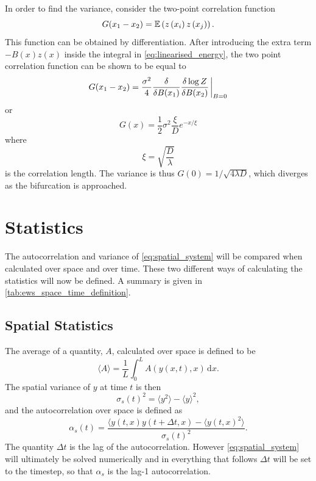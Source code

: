 In order to find the variance, consider the two-point correlation function
\begin{equation}
  \label{eq:two_point_corr}
  G(x_1 - x_2) = \operatorname*{\mathbb{E}} \left(z\left(x_i\right)z\left(x_j\right)\right).
\end{equation}
This function can be obtained by differentiation. After introducing the extra term $-B(x)z(x)$ inside the integral in \cref{eq:linearised_energy}, the two point correlation function
can be shown \parencite{Goldenfeld1992} to be equal to
\begin{equation}
  \label{eq:two_point_from_partition}
  G(x_1-x_2) = \frac{\sigma^2}{4}\fdv{B(x_1)}\fdv{\log Z}{B(x_2)} \eval_{B=0}
\end{equation}
or
\begin{equation}
  \label{eq:two_point_correlation_actual}
  G(x) = \frac{1}{2} \sigma^2 \frac{\xi}{D} e^{-x/\xi}
\end{equation}
where
\begin{equation}
  \label{eq:corr_len}
  \xi = \sqrt{\frac{D}{\lambda}}
\end{equation}
is the correlation length. The variance is thus $G(0) = 1/\sqrt{4\lambda D}$, which diverges as the bifurcation is approached.
\section{Statistics}
The autocorrelation and variance of \cref{eq:spatial_system} will be compared when calculated over space and over time. These two different ways of calculating the statistics  will now
be defined. A summary is given in \cref{tab:ews_space_time_definition}.

\subsection{Spatial Statistics}

The average of a quantity, $A$, calculated over space is defined to be
\begin{equation}
  \label{eq:definition_of_average}
  \langle A \rangle = \frac{1}{L}\int_0^L A(y(x,t),x) \,\mathrm{d}x.
\end{equation}
The spatial variance of $y$ at time $t$ is then
\begin{equation}
  \label{eq:spatial_variance}
  \sigma_s(t)^2 = \langle y^2 \rangle - \langle y \rangle^2,
\end{equation}
and the autocorrelation over space is defined as
\begin{equation}
  \label{eq:spatial_autocorrelation}
  \alpha_s(t) = \frac{\langle y(t,x)y(t+\Delta t,x) - \langle y(t,x)^2 \rangle }{\sigma_s(t)^2}.
\end{equation}
The quantity $\Delta t$ is the lag of the autocorrelation. However \cref{eq:spatial_system} will ultimately be solved numerically and
in everything that follows $\Delta t$ will be set to the timestep, so that $\alpha_s$ is the lag-1 autocorrelation.

